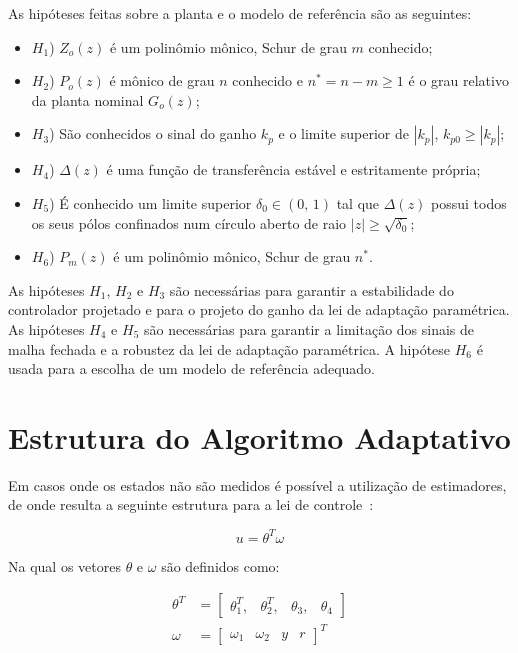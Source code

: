     As hipóteses feitas sobre a planta e o modelo de referência são as seguintes:

    \begin{itemize}
        \item[] $H_1$) $Z_o(z)$ é um polinômio mônico, Schur de grau $m$ conhecido;
        \item[] $H_2$) $P_o(z)$ é mônico de grau $n$ conhecido e $n^* = n - m \geq 1$ é o grau
            relativo da planta nominal $G_o(z)$;
        \item[] $H_3$) São conhecidos o sinal do ganho $k_p$ e o limite superior de $|k_p|$,
            $k_{p0} \geq |k_p|$;
        \item[] $H_4$) $\Delta(z)$ é uma função de transferência estável e estritamente
            própria;
        \item[] $H_5$) É conhecido um limite superior $\delta_0 \in (0, \, 1)$ tal que
            $\Delta(z)$ possui todos os seus pólos confinados num círculo aberto de
            raio $|z| \geq \sqrt{\delta_0}$;
        \item[] $H_6$) $P_m(z)$ é um polinômio mônico, Schur de grau $n^*$.
    \end{itemize}

    As hipóteses $H_1$, $H_2$ e $H_3$ são necessárias para garantir a estabilidade do
    controlador projetado e para o projeto do ganho da lei de adaptação paramétrica.
    As hipóteses $H_4$ e $H_5$ são necessárias para garantir a limitação dos sinais
    de malha fechada e a robustez da lei de adaptação paramétrica. A hipótese $H_6$
    é usada para a escolha de um modelo de referência adequado.

\section{Estrutura do Algoritmo Adaptativo}

    Em casos onde os estados não são medidos é possível a utilização de estimadores,
    de onde resulta a seguinte estrutura para a lei de controle~\cite{ref:TAO}:

    \begin{equation}
        u = \theta^T \omega
    \end{equation}

    Na qual os vetores $\theta$ e $\omega$ são definidos como:

    \begin{equation}
        \begin{split}
            \theta^T & = \left[ \begin{matrix} \theta_1^T, & \theta_2^T, & \theta_3, & \theta_4
                \end{matrix} \right]\\
            \omega & = {\left[ \begin{matrix} \omega_1 & \omega_2 & y & r \end{matrix}
                \right]}^T
        \end{split}
    \end{equation}

